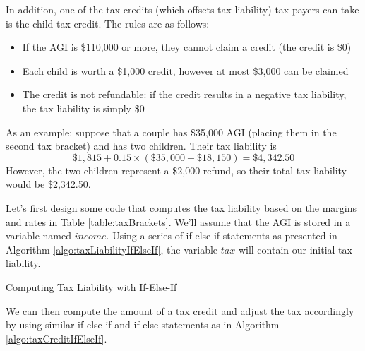 In addition, one of the tax credits (which offsets tax liability) tax payers can take 
is the child tax credit.  The rules are as follows:
\begin{itemize}
  \item If the AGI is \$110,000 or more, they cannot claim a credit (the credit is \$0)
  \item Each child is worth a \$1,000 credit, however at most \$3,000 can be claimed
  \item The credit is not refundable: if the credit results in a negative tax liability, the tax liability is simply \$0
\end{itemize}

As an example: suppose that a couple has \$35,000 AGI (placing them
in the second tax bracket) and has two children.  Their tax liability is
$$\$1,815 + 0.15 \times (\$35,000 - \$18,150) = \$4,342.50$$
However, the two children represent a \$2,000 refund, so their total tax liability would be \$2,342.50.

Let's first design some code that computes the tax liability based on the margins and
rates in Table \ref{table:taxBrackets}.  We'll assume that the AGI is stored in a variable
named $income$.  Using a series of if-else-if statements as presented in  Algorithm 
\ref{algo:taxLiabilityIfElseIf}, the variable $tax$ will contain our initial tax liability.

\begin{algorithm}[H]
\caption{Computing Tax Liability with If-Else-If}
\label{algo:taxLiabilityIfElseIf}
\end{algorithm}

We can then compute the amount of a tax credit and adjust the tax accordingly by using
similar if-else-if and if-else statements as in Algorithm \ref{algo:taxCreditIfElseIf}.

